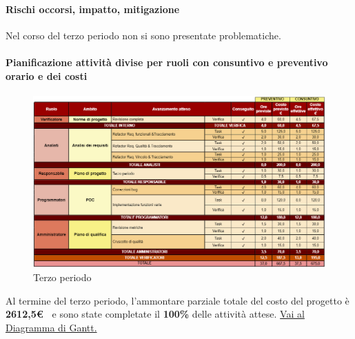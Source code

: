 \paragraph{Rischi occorsi, impatto, mitigazione} 

Nel corso del terzo periodo non si sono presentate problematiche.

\newpage
\paragraph{Pianificazione attività divise per ruoli con consuntivo e preventivo orario e dei costi}\hspace{1pt}

\begin{figure}[H]
    \centering
    \includegraphics[width=\linewidth, height=0.9\textheight, keepaspectratio]{../Images/periodo3.PNG}
    \caption{Terzo periodo}
    \label{fig:Terzo_periodo}
\end{figure}


Al termine del terzo periodo, l'ammontare parziale totale del costo del progetto è \textbf{ 2612,5\euro\ } e sono state completate il \textbf{100\%} delle attività attese.
\href{https://github.com/orgs/ByteOps-swe/projects/3/views/1?sortedBy%5Bdirection%5D=asc&sortedBy%5BcolumnId%5D=64182560}{Vai al Diagramma di Gantt.}\hspace{1pt}



